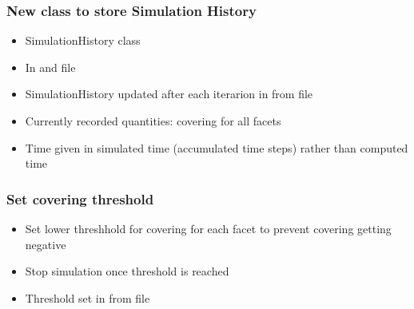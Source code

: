 \subsubsection{New class to store Simulation History}
\begin{itemize}[noitemsep,topsep=0pt]
\item SimulationHistory class 
\item In  and  file
\item SimulationHistory updated after each iterarion in  from  file
\item Currently recorded quantities: covering for all facets
\item Time given in simulated time (accumulated time steps) rather than computed time 
\end{itemize}

\subsubsection{Set covering threshold}
\begin{itemize}[noitemsep,topsep=0pt]
\item Set lower threshhold for covering for each facet to prevent covering getting negative
\item Stop simulation once threshold is reached
\item Threshold set in   from  file
\end{itemize}

